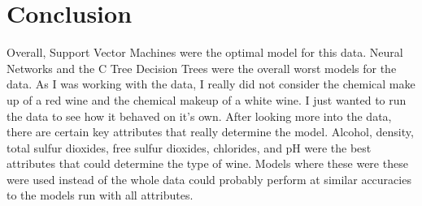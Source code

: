 \documentclass[letterpaper]{article}\usepackage[]{graphicx}\usepackage[]{color}
\begin{document}
\section*{Conclusion}
Overall, Support Vector Machines were the optimal model for this data. Neural Networks and the C Tree Decision Trees were the overall worst models for the data. As I was working with the data, I really did not consider the chemical make up of a red wine and the chemical makeup of a white wine. I just wanted to run the data to see how it behaved on it's own. After looking more into the data, there are certain key attributes that really determine the model. Alcohol, density, total sulfur dioxides, free sulfur dioxides, chlorides, and pH were the best attributes that could determine the type of wine. Models where these were these were used instead of the whole data could probably perform at similar accuracies to the models run with all attributes. 
\end{document}
